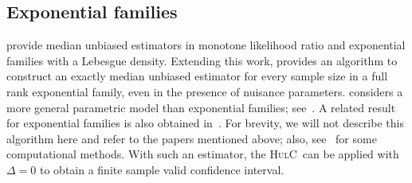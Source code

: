 \documentclass{article}
\newcommand{\hulc}{\textsc{HulC}~}
\numberwithin{myalgctr}{section}
\begin{document}
\subsection{Exponential families}
{\color{black}\citet[Sections 3.5 and 5.4]{Lehmann1959} provide median unbiased estimators in monotone likelihood ratio and exponential families with a Lebesgue density. 
Extending this work,} \cite{pfanzagl1979optimal} provides an algorithm to construct an exactly median unbiased estimator for every sample size in a full rank exponential family, even in the presence of nuisance parameters. \cite{pfanzagl1979optimal} considers a more general parametric model than exponential families; see~\cite{read2004median}. A related result for exponential families is also obtained in~\cite{brown1976complete}. For brevity, we will not describe this algorithm here and refer to the papers mentioned above; also, see~\cite{cabrera1997simulation} for some computational methods. With such an estimator, the \hulc can be applied with $\Delta = 0$ to obtain a finite sample valid confidence interval.
\end{document}
